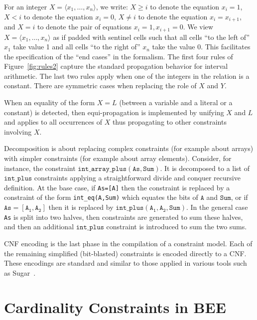 \documentclass[runningheads,a4paper]{llncs}
\newcommand\tuple[1]{\langle #1 \rangle}
\newcommand{\bee}{\textsf{BEE}}
\begin{document}
For an integer $X=\tuple{x_1,\ldots,x_n}$, we
write: $X\geq i$ to denote the equation $x_i=1$, $X<i$ to denote the
equation $x_i=0$, $X\neq i$ to denote the equation $x_i=x_{i+1}$, and
$X=i$ to denote the pair of equations $x_i=1,x_{i+1}=0$.
We view $X=\tuple{x_1,\ldots,x_n}$ as if padded with sentinel cells
such that all cells ``to the left of'' $x_1$ take value 1 and all
cells ``to the right of'' $x_n$ take the value 0. This facilitates the
specification of the ``end cases'' in the formalism.
The first four rules of Figure~\ref{fig:rules2} capture the
standard propagation behavior for interval arithmetic. The last two
rules apply when one of the integers in the relation is a
constant. There are symmetric cases when replacing the role of $X$ and
$Y$.

When an equality of the form $X=L$ (between a variable and a literal
or a constant) is detected, then equi-propagation is implemented by
unifying $X$ and $L$ and applies to all occurrences of $X$ thus
propagating to other constraints involving $X$.

Decomposition is about replacing complex constraints (for example
about arrays) with simpler constraints (for example about array
elements). Consider, for instance, the constraint
$\mathtt{int\_array\_plus(As,Sum)}$. It is decomposed to a list of
$\mathtt{int\_plus}$ constraints applying a straightforward divide and
conquer recursive definition. At the base case, if \texttt{As=[A]}
then the constraint is replaced by a constraint of the form
\texttt{int\_eq(A,Sum)} which equates the bits of $\mathtt{A}$ and
$\mathtt{Sum}$, or if $\mathtt{As=[A_1,A_2]}$ then it is replaced by
$\mathtt{int\_plus(A_1,A_2,Sum)}$.
In the general case \texttt{As} is split into two halves, then
constraints are generated to sum these halves, and then an additional
$\mathtt{int\_plus}$ constraint is introduced to sum the two sums.

CNF encoding is the last phase in the compilation of a constraint
model. Each of the remaining simplified (bit-blasted) constraints is
encoded directly to a CNF. These encodings are standard and similar to
those applied in various tools such as Sugar~\cite{sugar2009}.




\section{Cardinality Constraints in \bee}
\end{document}
